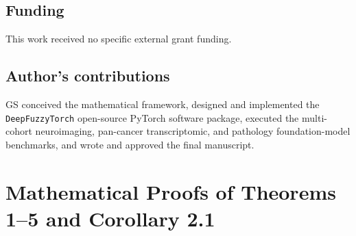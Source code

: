 \documentclass[10pt,twocolumn]{article}
\begin{document}
\subsection*{Funding}
This work received no specific external grant funding.

\subsection*{Author's contributions}
GS conceived the mathematical framework, designed and implemented the \texttt{DeepFuzzyTorch}
open-source PyTorch software package, executed the multi-cohort neuroimaging, pan-cancer
transcriptomic, and pathology foundation-model benchmarks, and wrote and approved the final
manuscript.

\FloatBarrier
\appendix
\section{Mathematical Proofs of Theorems 1--5 and Corollary 2.1}
\label{app:proofs}
\end{document}
